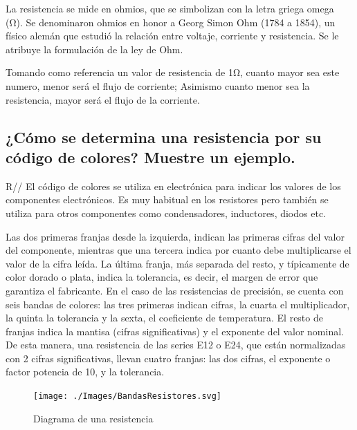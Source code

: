 \documentclass[letterpaper, 12pt]{report}
\begin{document}
La resistencia se mide en ohmios, que se simbolizan con la letra griega
omega (Ω). Se denominaron ohmios en honor a Georg Simon Ohm (1784 a 1854),
un físico alemán que estudió la relación entre voltaje, corriente y
resistencia. Se le atribuye la formulación de la ley de Ohm.
~\cite{DefinicionResistenciaPlusOhmios}

\vspace{.5cm}

Tomando como referencia un valor de resistencia de 1Ω, cuanto mayor sea este
numero, menor será el flujo de corriente; Asimismo cuanto menor sea la
resistencia, mayor será el flujo de la corriente.
~\cite{DefinicionResistenciaPlusOhmios}

\subsection{¿Cómo se determina una resistencia por su código de
	colores? Muestre un ejemplo.}

R// El código de colores se utiliza en electrónica para indicar los
valores de los componentes electrónicos. Es muy habitual en los resistores
pero también se utiliza para otros componentes como condensadores,
inductores, diodos etc.~\cite{CodigoColores}

\vspace{.5cm}

Las dos primeras franjas desde la izquierda, indican las primeras cifras
del valor del componente, mientras que una tercera indica por cuanto debe
multiplicarse el valor de la cifra leída. La última franja, más separada
del resto, y típicamente de color dorado o plata, indica la tolerancia,
es decir, el margen de error que garantiza el fabricante. En el caso de
las resistencias de precisión, se cuenta con seis bandas de colores: las
tres primeras indican cifras, la cuarta el multiplicador, la quinta la
tolerancia y la sexta, el coeficiente de temperatura. El resto de franjas
indica la mantisa (cifras significativas) y el exponente del valor
nominal. De esta manera, una resistencia de las series E12 o E24, que
están normalizadas con 2 cifras significativas, llevan cuatro franjas: las
dos cifras, el exponente o factor potencia de 10, y la tolerancia.

\vspace{.5cm}

\begin{figure}[H]
	\centering

	\texttt{[image: ./Images/BandasResistores.svg]}
	\caption{Diagrama de una resistencia}
\end{figure}
\end{document}
